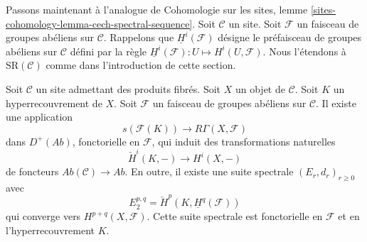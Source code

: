 \noindent
Passons maintenant à l'analogue de Cohomologie sur les sites, lemme
\ref{sites-cohomology-lemma-cech-spectral-sequence}.
Soit $\mathcal{C}$ un site.
Soit $\mathcal{F}$ un faisceau de groupes abéliens sur $\mathcal{C}$.
Rappelons que $\underline{H}^i(\mathcal{F})$ désigne le préfaisceau
de groupes abéliens sur $\mathcal{C}$ défini par la
règle $\underline{H}^i(\mathcal{F}) : U \longmapsto H^i(U, \mathcal{F})$.
Nous l'étendons à $\text{SR}(\mathcal{C})$ comme dans l'introduction
de cette section.

\begin{lemma}
\label{lemma-cech-spectral-sequence}
Soit $\mathcal{C}$ un site admettant des produits fibrés.
Soit $X$ un objet de $\mathcal{C}$.
Soit $K$ un hyperrecouvrement de $X$.
Soit $\mathcal{F}$ un faisceau de groupes abéliens sur $\mathcal{C}$.
Il existe une application
$$
s(\mathcal{F}(K))
\longrightarrow
R\Gamma(X, \mathcal{F})
$$
dans $D^{+}(\textit{Ab})$, fonctorielle en $\mathcal{F}$, qui induit des
transformations naturelles
$$
\check{H}^i(K, -) \longrightarrow H^i(X, -)
$$
de foncteurs $\textit{Ab}(\mathcal{C}) \to \textit{Ab}$. En outre,
il existe une suite spectrale $(E_r, d_r)_{r \geq 0}$ avec
$$
E_2^{p, q} = \check{H}^p(K, \underline{H}^q(\mathcal{F}))
$$
qui converge vers $H^{p + q}(X, \mathcal{F})$.
Cette suite spectrale est fonctorielle en $\mathcal{F}$ et
en l'hyperrecouvrement $K$.
\end{lemma}

